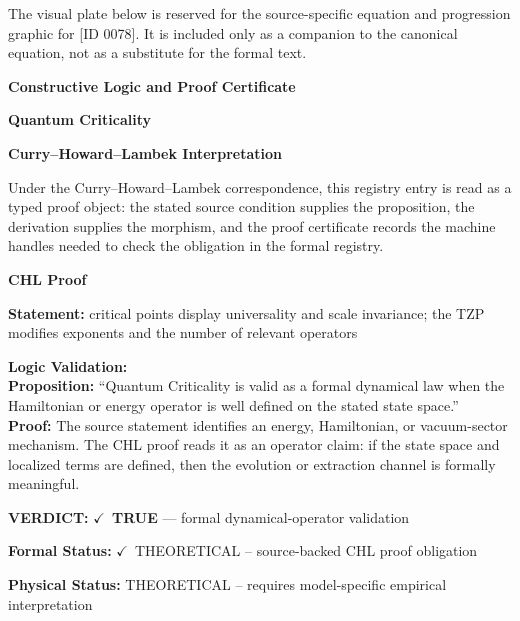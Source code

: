 \begingroup\footnotesize\sloppy
The visual plate below is reserved for the source-specific equation and progression graphic for [ID 0078]. It is included only as a companion to the canonical equation, not as a substitute for the formal text.
\par\endgroup
\ifTZPDarkEdition
{}
\fi

\clearpage
\begingroup\tzpsupportsetup
\noindent\textbf{\fontsize{10.8pt}{12.8pt}\selectfont [ID 0078] Constructive Logic and Proof Certificate}\par
\noindent\textbf{\fontsize{10pt}{12pt}\selectfont Quantum Criticality}\par
\vspace{0.45em}
\begingroup
\footnotesize
\setlength{\parskip}{0.22em}
\setlength{\parindent}{0pt}
\noindent\textbf{Curry--Howard--Lambek Interpretation}\par
Under the Curry--Howard--Lambek correspondence, this registry entry is read as a typed proof
object: the stated source condition supplies the proposition, the derivation supplies the
morphism, and the proof certificate records the machine handles needed to check the obligation
in the formal registry.

\vspace{0.45em}
\noindent\textbf{CHL Proof}\par
\textbf{Statement:} critical points display universality and scale invariance; the TZP modifies exponents
and the number of relevant operators

\textbf{Logic Validation:}\\
\textbf{Proposition:} ``Quantum Criticality is valid as a formal dynamical law when the Hamiltonian or energy
operator is well defined on the stated state space.''\\
\textbf{Proof:} The source statement identifies an energy, Hamiltonian, or vacuum-sector mechanism. The
CHL proof reads it as an operator claim: if the state space and localized terms are
defined, then the evolution or extraction channel is formally meaningful.

\textbf{VERDICT:} \ensuremath{\checkmark}\ \textbf{TRUE} --- formal dynamical-operator validation

\textbf{Formal Status:} \ensuremath{\checkmark}\ THEORETICAL -- source-backed CHL proof obligation

\textbf{Physical Status:} THEORETICAL -- requires model-specific empirical interpretation
\par\vspace{0.45em}
\par
\ifTZPDarkEdition
{}
\fi
\endgroup
\endgroup
